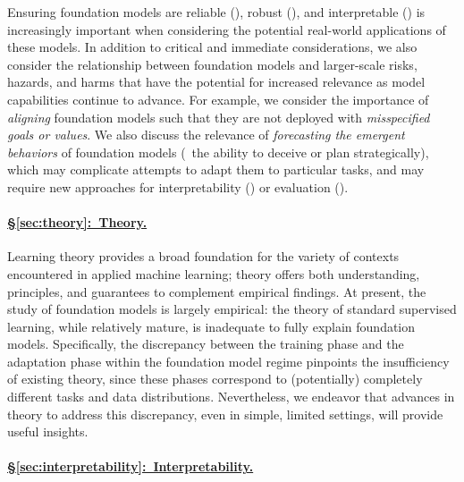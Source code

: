 Ensuring foundation models are reliable (), robust (), and interpretable () is increasingly important when considering the potential real-world applications of these models.
In addition to critical and immediate considerations, we also consider the relationship between foundation models and larger-scale risks, hazards, and harms that have the potential for increased relevance as model capabilities continue to advance.
For example, we consider the importance of \textit{aligning} foundation models such that they are not deployed with \textit{misspecified goals or values}. We also discuss the relevance of \textit{forecasting the emergent behaviors} of foundation models (\eg~the ability to deceive or plan strategically), which may complicate attempts to adapt them to particular tasks, and may require new approaches for interpretability () or evaluation ().

\paragraph{\hyperref[sec:theory]{§\ref{sec:theory}:~Theory.}}

Learning theory provides a broad foundation for the variety of contexts encountered in applied machine learning; theory offers both understanding, principles, and guarantees to complement empirical findings.
At present, the study of foundation models is largely empirical: the theory of standard supervised learning, while relatively mature, is inadequate to fully explain foundation models.
Specifically, the discrepancy between the training phase and the adaptation phase within the foundation model regime pinpoints the insufficiency of existing theory, since these phases correspond to (potentially) completely different tasks and data distributions.
Nevertheless, we endeavor that advances in theory to address this discrepancy, even in simple, limited settings, will provide useful insights. 

\paragraph{\hyperref[sec:interpretability]{§\ref{sec:interpretability}:~Interpretability.}}

